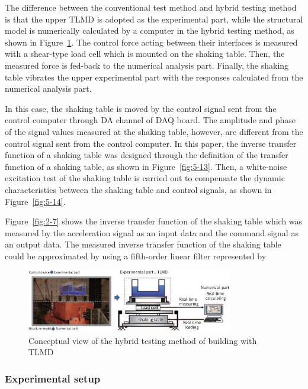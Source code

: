 The difference between the conventional test method and hybrid testing method is that the upper TLMD is adopted as the experimental part, while the structural model is numerically calculated by a computer in the hybrid testing method, as shown in Figure~\ref{fig:5-12}. The control force acting between their interfaces is measured with a shear-type load cell which is mounted on the shaking table. Then, the measured force is fed-back to the numerical analysis part. Finally, the shaking table vibrates the upper experimental part with the responses calculated from the numerical analysis part.

In this case, the shaking table is moved by the control signal sent from the control computer through DA channel of DAQ board. The amplitude and phase of the signal values measured at the shaking table, however, are different from the control signal sent from the control computer. In this paper, the inverse transfer function of a shaking table was designed through the definition of the transfer function of a shaking table, as shown in Figure~\ref{fig:5-13}. Then, a white-noise excitation test of the shaking table is carried out to compensate the dynamic characteristics between the shaking table and control signals, as shown in Figure~\ref{fig:5-14}. 

Figure~\ref{fig:2-7} shows the inverse transfer function of the shaking table which was measured by the acceleration signal as an input data and the command signal as an output data. The measured inverse transfer function of the shaking table could be approximated by using a fifth-order linear filter represented by


\begin{figure}[ht]
\centering
\includegraphics[width=0.8\textwidth] {figure/5-12.eps}
\caption{Conceptual view of the hybrid testing method of building with TLMD}
\label{fig:5-12}
\end{figure}




\subsubsection{Experimental setup}

